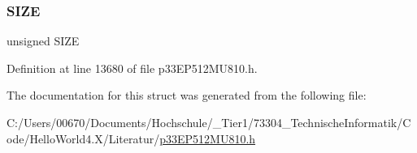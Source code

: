 \subsubsection{\texorpdfstring{S\+I\+ZE}{SIZE}}
{\footnotesize\ttfamily unsigned S\+I\+ZE}



Definition at line 13680 of file p33\+E\+P512\+M\+U810.\+h.



The documentation for this struct was generated from the following file\+:\begin{DoxyCompactItemize}
\item 
C\+:/\+Users/00670/\+Documents/\+Hochschule/\+\_\+\+Tier1/73304\+\_\+\+Technische\+Informatik/\+Code/\+Hello\+World4.\+X/\+Literatur/\hyperlink{p33_e_p512_m_u810_8h}{p33\+E\+P512\+M\+U810.\+h}\end{DoxyCompactItemize}
